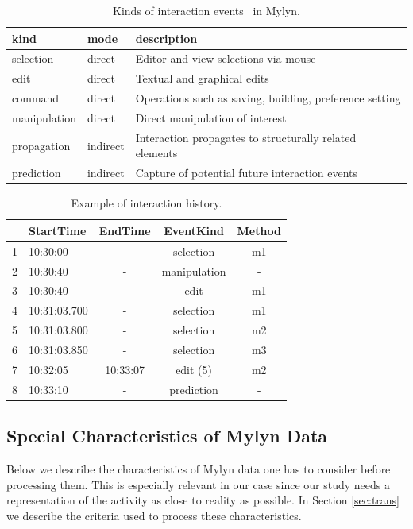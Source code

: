 \documentclass[times]{smrauth}
\begin{document}
\begin{table}[ht!]
\small
\renewcommand{\arraystretch}{1.3}
\caption{Kinds of interaction events~\cite{KM06} in Mylyn. }
\label{tbl:kind_event}
\centering
\begin{tabular}{|p{1.7cm}|p{1.3cm}|p{8cm}|} 
  \hline 
kind & mode & description \\  
  \hline 
    \hline 
selection & direct &  Editor and view selections via mouse \\
edit & direct & Textual and graphical edits  \\
command & direct & Operations such as saving, building, preference setting  \\
manipulation & direct & Direct manipulation of interest  \\
propagation & indirect & Interaction propagates to structurally related elements  \\
prediction & indirect & Capture of potential future interaction events \\
  \hline
\end{tabular}

\end{table}


\begin{table}[ht!]
\small
\renewcommand{\arraystretch}{1.3}
\caption{ Example of interaction history. }
\label{tbl:sample_event}
\centering
\begin{tabular}{|c|l|c|c|c|} 
  \hline 
    & StartTime & EndTime & EventKind &  Method  \\
  \hline
  \hline
  1 & 10:30:00 & - & selection & m1  \\
  2 & 10:30:40 & - & manipulation & - \\
  3 & 10:30:40 & - & edit & m1  \\
  4 & 10:31:03.700 & - & selection & m1  \\
  5 & 10:31:03.800 & - & selection & m2  \\	  
  6 & 10:31:03.850 & - & selection & m3  \\	  
  7 & 10:32:05 & 10:33:07 & edit (5) & m2  \\	  
  8 & 10:33:10 & - & prediction & - \\
  \hline  
\end{tabular}
\end{table}



\subsection{Special Characteristics of Mylyn Data}
 Below we describe the characteristics of Mylyn data one has to consider before processing them. This is especially relevant in our case since our study needs a representation of the activity as close to reality as possible.  In Section \ref{sec:trans} we describe the criteria used to process these characteristics. 
\end{document}
